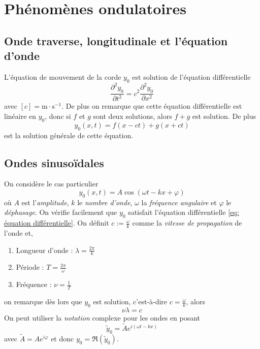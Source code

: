 \documentclass[10pt]{article}
\numberwithin{equation}{section}
\begin{document}
\clearpage
\section{Phénomènes ondulatoires}

\subsection{Onde traverse, longitudinale et l'équation d'onde}
L'équation de mouvement de la corde $y_0$ est solution de l'équation différentielle
\begin{equation} \label{eq: équation différentielle}
\boxed{\frac{\partial^2 y_0}{\partial t^2} = c^2 \frac{\partial^2 y_0}{\partial x^2}}
\end{equation}
avec $[c]= \mathrm m \cdot \mathrm s^{-1}$. De plus on remarque que cette équation différentielle est linéaire en $y_0$, donc si $f$ et $g$ sont deux solutions, alors $f+g$ est solution. De plus
\[
y_0(x,t) = f(x - ct) + g(x + ct)
\]
est la solution générale de cette équation.

\subsection{Ondes sinusoïdales}
On considère le cas particulier
\[
y_0(x,t) = A \cos(\omega t - kx + \varphi)
\]
où $A$ est l'\emph{amplitude}, $k$ le \emph{nombre d'onde}, $\omega$ la \emph{fréquence angulaire} et $\varphi$ le \emph{déphasage}. On vérifie facilement que $y_0$ satisfait l'équation différentielle \eqref{eq: équation différentielle}. On définit $c := \frac\omega{k}$ comme la \emph{vitesse de propagation} de l'onde et,
\begin{enumerate}
	\item Longueur d'onde : $\lambda = \frac{2\pi}k$
	\item Période : $T = \frac{2\pi}\omega$
	\item Fréquence : $\nu = \frac1T$
\end{enumerate}
on remarque dès lors que $y_0$ est solution, c'est-à-dire $c = \frac\omega{k}$, alors
\[
\boxed{\nu \lambda} = c
\]
On peut utiliser la \emph{notation} complexe pour les ondes en posant
\[
\boxed{\tilde y_0 = \tilde A e^{i(\omega t- kx)}}
\]
avec $\tilde A = A e^{i \varphi}$ et donc $y_0 = \Re(\tilde y_0)$.
\end{document}
